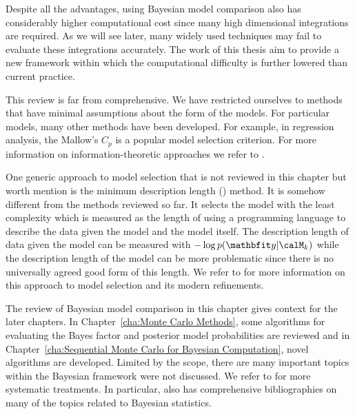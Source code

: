 Despite all the advantages, using Bayesian model comparison also has
considerably higher computational cost since many high dimensional
integrations are required. As we will see later, many widely used techniques
may fail to evaluate these integrations accurately. The work of this thesis
aim to provide a new framework within which the computational difficulty is
further lowered than current practice.


This review is far from comprehensive. We have restricted ourselves to methods
that have minimal assumptions about the form of the models. For particular
models, many other methods have been developed. For example, in regression
analysis, the Mallow's $C_p$ is a popular model selection criterion. For more
information on information-theoretic approaches we refer to
\cite{Burnham:2002wc,Claeskens:2008tq}.

One generic approach to model selection that is not reviewed in this chapter
but worth mention is the minimum description length (\mdl) method. It is
somehow different from the methods reviewed so far. It selects the model with
the least complexity which is measured as the length of using a programming
language to describe the data given the model and the model itself. The
description length of data given the model can be measured with $-\log
p(\data|\calM_k)$ while the description length of the model can be more
problematic since there is no universally agreed good form of this length. We
refer to \cite{Grunwald:2005vx} for more information on this approach to model
selection and its modern refinements.

The review of Bayesian model comparison in this chapter gives context for the
later chapters. In Chapter~\ref{cha:Monte Carlo Methods}, some algorithms for
evaluating the Bayes factor and posterior model probabilities are reviewed and
in Chapter~\ref{cha:Sequential Monte Carlo for Bayesian Computation}, novel
algorithms are developed. Limited by the scope, there are many important
topics within the Bayesian framework were not discussed. We refer to
\cite{Bernardo:1994vd,Robert:2007tc} for more systematic treatments. In
particular, \cite{Bernardo:1994vd} also has comprehensive bibliographies on
many of the topics related to Bayesian statistics.
